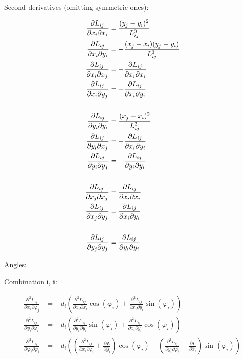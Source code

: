 Second derivatives (omitting symmetric ones):


\begin{align}
\frac{\partial L_{ij}}{\partial x_i \partial x_i} &= \frac{(y_j - y_i)^2}{L_{ij}^3} \\
\frac{\partial L_{ij}}{\partial x_i \partial y_i} &= -\frac{(x_j - x_i)(y_j - y_i)}{L_{ij}^3} \\
\frac{\partial L_{ij}}{\partial x_i \partial x_j} &= -\frac{\partial L_{ij}}{\partial x_i \partial x_i} \\
\frac{\partial L_{ij}}{\partial x_i \partial y_j} &= -\frac{\partial L_{ij}}{\partial x_i \partial y_i} \\
\notag \\
\frac{\partial L_{ij}}{\partial y_i \partial y_i} &= \frac{(x_j - x_i)^2}{L_{ij}^3} \\
\frac{\partial L_{ij}}{\partial y_i \partial x_j} &= -\frac{\partial L_{ij}}{\partial x_i \partial y_i} \\
\frac{\partial L_{ij}}{\partial y_i \partial y_j} &= -\frac{\partial L_{ij}}{\partial y_i \partial y_i} \\
\notag \\
\frac{\partial L_{ij}}{\partial x_j \partial x_j} &= \frac{\partial L_{ij}}{\partial x_i \partial x_i} \\
\frac{\partial L_{ij}}{\partial x_j \partial y_j} &= \frac{\partial L_{ij}}{\partial x_i \partial y_i} \\
\notag \\
\frac{\partial L_{ij}}{\partial y_j \partial y_j} &= \frac{\partial L_{ij}}{\partial y_i \partial y_i}
\end{align}

\newpage
Angles:

Combination i, i:

\begin{align}
\frac{\partial^2 L_{ij}}{\partial x_{i} \partial \varphi_{j}} &= -d_{i}\left( \frac{\partial^2 L_{ij}}{\partial x_{i} \partial x_{i}}\cos(\varphi_{i}) + \frac{\partial^2 L_{ij}}{\partial x_{i} \partial y_{i}}\sin(\varphi_{i})\right) \\
\frac{\partial^2 L_{ij}}{\partial y_{i} \partial \varphi_{i}} &= -d_{i}\left( \frac{\partial^2 L_{ij}}{\partial y_{i} \partial y_{i}}\sin(\varphi_{i}) + \frac{\partial^2 L_{ij}}{\partial x_{i} \partial y_{i}}\cos(\varphi_{i})\right) \\
\frac{\partial^2 L_{ij}}{\partial \varphi_{i} \partial \varphi_{i}} &= -d_{i}\left(\left(\frac{\partial^2 L_{ij}}{\partial x_{i} \partial \varphi_{i}} + \frac{\partial L}{\partial \bar{y}_{i}}\right)\cos(\varphi_{i}) + \left(\frac{\partial^2 L_{ij}}{\partial y_{i} \partial \varphi_{i}} - \frac{\partial L}{\partial \bar{x}_{i}}\right)\sin(\varphi_{i})\right)
\end{align}

